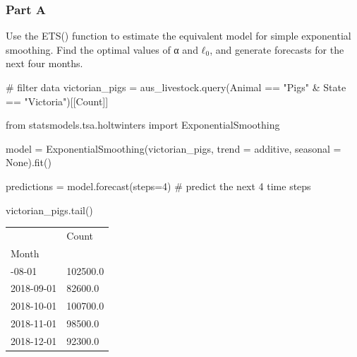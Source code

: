 \documentclass[
  11pt,
]{article}
\newenvironment{Shaded}{\begin{snugshade}}{\end{snugshade}}
\newcommand{\CommentTok}[1]{\textcolor[rgb]{0.37,0.37,0.37}{#1}}
\newcommand{\DecValTok}[1]{\textcolor[rgb]{0.68,0.00,0.00}{#1}}
\newcommand{\ImportTok}[1]{\textcolor[rgb]{0.00,0.46,0.62}{#1}}
\newcommand{\NormalTok}[1]{\textcolor[rgb]{0.00,0.23,0.31}{#1}}
\newcommand{\OperatorTok}[1]{\textcolor[rgb]{0.37,0.37,0.37}{#1}}
\newcommand{\StringTok}[1]{\textcolor[rgb]{0.13,0.47,0.30}{#1}}
\newcommand{\VariableTok}[1]{\textcolor[rgb]{0.07,0.07,0.07}{#1}}
\begin{document}
\subsubsection{Part A}\label{part-a}

Use the ETS() function to estimate the equivalent model for simple
exponential smoothing. Find the optimal values of α and \(ℓ_0\), and
generate forecasts for the next four months.

\begin{Shaded}
\begin{Highlighting}[]
\CommentTok{\# filter data}
\NormalTok{victorian\_pigs }\OperatorTok{=}\NormalTok{ aus\_livestock.query(}\StringTok{\textquotesingle{}Animal == "Pigs" \& State == "Victoria"\textquotesingle{}}\NormalTok{)[[}\StringTok{\textquotesingle{}Count\textquotesingle{}}\NormalTok{]]}
\end{Highlighting}
\end{Shaded}

\begin{Shaded}
\begin{Highlighting}[]
\ImportTok{from}\NormalTok{ statsmodels.tsa.holtwinters }\ImportTok{import}\NormalTok{ ExponentialSmoothing}

\NormalTok{model }\OperatorTok{=}\NormalTok{ ExponentialSmoothing(victorian\_pigs, trend }\OperatorTok{=} \StringTok{\textquotesingle{}additive\textquotesingle{}}\NormalTok{, seasonal }\OperatorTok{=} \VariableTok{None}\NormalTok{).fit()}

\NormalTok{predictions }\OperatorTok{=}\NormalTok{ model.forecast(steps}\OperatorTok{=}\DecValTok{4}\NormalTok{) }\CommentTok{\# predict the next 4 time steps}
\end{Highlighting}
\end{Shaded}

\begin{Shaded}
\begin{Highlighting}[]
\NormalTok{victorian\_pigs.tail()}
\end{Highlighting}
\end{Shaded}

\begin{longtable}[]{@{}ll@{}}
\toprule\noalign{}
& Count \\
Month & \\
\midrule\noalign{}
\endhead
\bottomrule\noalign{}
\endlastfoot
2018-08-01 & 102500.0 \\
2018-09-01 & 82600.0 \\
2018-10-01 & 100700.0 \\
2018-11-01 & 98500.0 \\
2018-12-01 & 92300.0 \\
\end{longtable}
\end{document}
